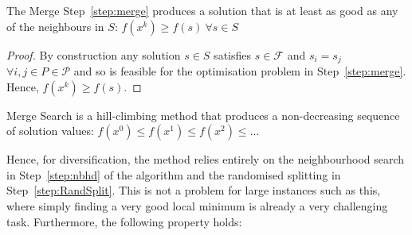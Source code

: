 \documentclass[journal]{IEEEtran}
\begin{document}
\begin{lemma}\label{thm:improve}
  The Merge Step~\ref{step:merge} produces a solution that is at least as good
  as any of the neighbours in $S$: $f(x^k) \ge f(s)\ \forall s\in S$
\end{lemma}
\begin{proof}
  By construction any solution $s\in S$ satisfies $s\in \mathcal{F}$ and
  $s_i=s_j$ $\forall i,j\in P\in\mathcal{P}$ and so is feasible for the
  optimisation problem in Step~\ref{step:merge}. Hence, $f(x^k)\ge f(s)$.
\end{proof}

\begin{corollary}\label{thm:hill-climb}
  Merge Search is a hill-climbing method that produces a non-decreasing sequence
 of solution values: $f(x^0)\le f(x^1)\le f(x^2)\le \ldots$
\end{corollary}

Hence, for diversification, the method relies entirely on the neighbourhood
search in Step~\ref{step:nbhd} of the algorithm and the randomised splitting in
Step~\ref{step:RandSplit}. This is not a problem for large instances such as
this, where simply finding a very good local minimum is already a very
challenging task. Furthermore, the following property holds:
\end{document}
